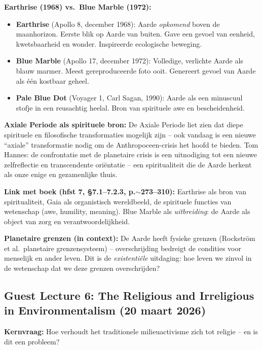 \documentclass[a4paper,10pt]{article}
\begin{document}
\textbf{Earthrise (1968) vs.\ Blue Marble (1972):}
\begin{itemize}[noitemsep]
  \item \textbf{Earthrise} (Apollo 8, december 1968): Aarde \textit{opkomend} boven de maanhorizon. Eerste blik op Aarde van buiten. Gave een gevoel van eenheid, kwetsbaarheid en wonder. Inspireerde ecologische beweging.
  \item \textbf{Blue Marble} (Apollo 17, december 1972): Volledige, verlichte Aarde als blauw marmer. Meest gereproduceerde foto ooit. Genereert gevoel van Aarde als één kostbaar geheel.
  \item \textbf{Pale Blue Dot} (Voyager 1, Carl Sagan, 1990): Aarde als een minuscuul stofje in een reusachtig heelal. Bron van spirituele awe en bescheidenheid.
\end{itemize}

\textbf{Axiale Periode als spirituele bron:} De Axiale Periode liet zien dat diepe spirituele en filosofische transformaties mogelijk zijn -- ook vandaag is een nieuwe ``axiale'' transformatie nodig om de Anthropoceen-crisis het hoofd te bieden. Tom Hannes: de confrontatie met de planetaire crisis is een uitnodiging tot een nieuwe zelfreflectie en transcendente oriëntatie -- een spiritualiteit die de Aarde herkent als onze enige en gezamenlijke thuis.

\textbf{Link met boek (hfst 7, §7.1--7.2.3, p.$\sim$273--310):} Earthrise als bron van spiritualiteit, Gaia als organistisch wereldbeeld, de spirituele functies van wetenschap (awe, humility, meaning). Blue Marble als \textit{uitbreiding}: de Aarde als object van zorg en verantwoordelijkheid.

\textbf{Planetaire grenzen (in context):} De Aarde heeft fysieke grenzen (Rockström et al.\ planetaire grenzensysteem) -- overschrijding bedreigt de condities voor menselijk en ander leven. Dit is de \textit{existentiële} uitdaging: hoe leven we zinvol in de wetenschap dat we deze grenzen overschrijden?

\subsection{Guest Lecture 6: The Religious and Irreligious in Environmentalism (20 maart 2026)}
\textbf{Kernvraag:} Hoe verhoudt het traditionele milieuactivisme zich tot religie -- en is dit een probleem?
\end{document}
